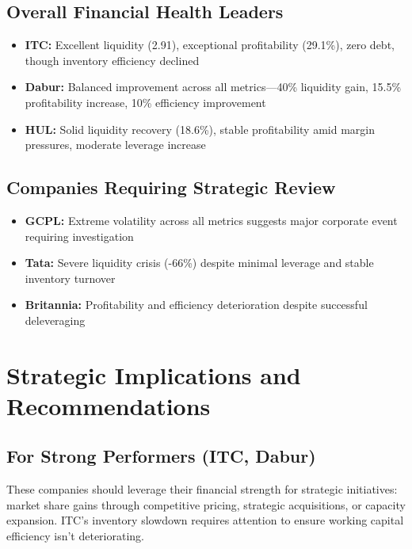 \documentclass[12pt, a4paper]{report}
\begin{document}
\subsection{Overall Financial Health Leaders}

\begin{itemize}
    \item \textbf{ITC:} Excellent liquidity (2.91), exceptional profitability (29.1\%), zero debt, though inventory efficiency declined
    \item \textbf{Dabur:} Balanced improvement across all metrics—40\% liquidity gain, 15.5\% profitability increase, 10\% efficiency improvement
    \item \textbf{HUL:} Solid liquidity recovery (18.6\%), stable profitability amid margin pressures, moderate leverage increase
\end{itemize}

\subsection{Companies Requiring Strategic Review}

\begin{itemize}
    \item \textbf{GCPL:} Extreme volatility across all metrics suggests major corporate event requiring investigation
    \item \textbf{Tata:} Severe liquidity crisis (-66\%) despite minimal leverage and stable inventory turnover
    \item \textbf{Britannia:} Profitability and efficiency deterioration despite successful deleveraging
\end{itemize}

\section{Strategic Implications and Recommendations}

\subsection{For Strong Performers (ITC, Dabur)}

These companies should leverage their financial strength for strategic initiatives: market share gains through competitive pricing, strategic acquisitions, or capacity expansion. ITC's inventory slowdown requires attention to ensure working capital efficiency isn't deteriorating.
\end{document}
